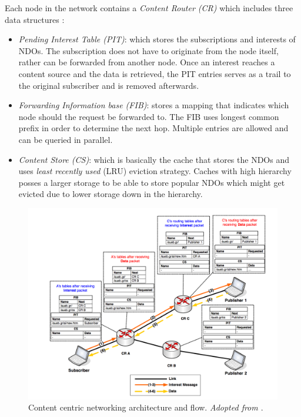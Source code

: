 Each node in the network contains a \textit{Content Router (CR)} which includes three data structures \cite{6563278}\cite{6231276}:
\begin{itemize}
\item \textit{Pending Interest Table (PIT)}: which stores the subscriptions and interests of NDOs. The subscription does not have to originate  from the node itself, rather can be forwarded from another node. Once an interest reaches a content source and the data is retrieved, the PIT entries serves as a trail to the original subscriber and is removed afterwards.

\item \textit{Forwarding Information base (FIB)}:  stores a mapping that indicates which node should the request be forwarded to. The FIB uses longest common prefix in order to determine the next hop. Multiple entries are allowed and can be queried in parallel.

\item \textit{Content Store (CS)}: which is basically the cache that stores the NDOs and uses \textit{least recently used} (LRU) eviction strategy. Caches with high hierarchy posses a larger storage to be able to store popular NDOs which might get evicted due to  lower storage down in the hierarchy.
\end{itemize}  

\begin{figure}[H]
	\centering
	\includegraphics[scale=0.4]{images/ccn2.png}
	\caption{Content centric networking architecture and flow. \textit{Adopted from \cite{6563278}}.}
	\label{fig:ccn}
\end{figure}

